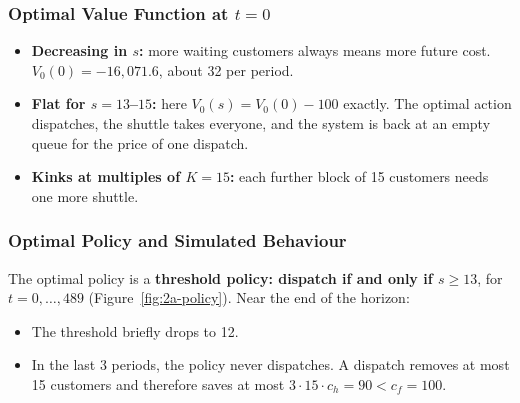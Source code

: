 \subsubsection{\texorpdfstring{Optimal Value Function at $t = 0$}{Optimal Value Function at t = 0}}


\begin{itemize}
  \item \textbf{Decreasing in $s$:} more waiting customers always means more future cost. $V_0(0) = -16{,}071.6$, about 32 per period.
  \item \textbf{Flat for $s = 13$--$15$:} here $V_0(s) = V_0(0) - 100$ exactly. The optimal action dispatches, the shuttle takes everyone, and the system is back at an empty queue for the price of one dispatch.
  \item \textbf{Kinks at multiples of $K = 15$:} each further block of 15 customers needs one more shuttle.
\end{itemize}

\subsubsection{Optimal Policy and Simulated Behaviour}


The optimal policy is a \textbf{threshold policy: dispatch if and only if $s \geq 13$}, for $t = 0, \dots, 489$ (Figure~\ref{fig:2a-policy}). Near the end of the horizon:
\begin{itemize}
  \item The threshold briefly drops to 12.
  \item In the last 3 periods, the policy never dispatches. A dispatch removes at most 15 customers and therefore saves at most $3 \cdot 15 \cdot c_h = 90 < c_f = 100$.
\end{itemize}


